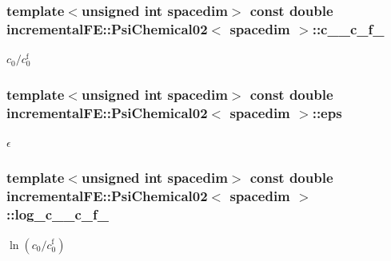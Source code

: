 \subsubsection[{\texorpdfstring{c\+\_\+0\+\_\+c\+\_\+f\+\_\+0}{c_0_c_f_0}}]{\setlength{\rightskip}{0pt plus 5cm}template$<$unsigned int spacedim$>$ const double {\bf incremental\+F\+E\+::\+Psi\+Chemical02}$<$ spacedim $>$\+::c\+\_\+\_\+c\+\_\+f\+\_\hspace{0.3cm}{\ttfamily [private]}}\hypertarget{classincremental_f_e_1_1_psi_chemical02_aa2b9c1f2f65985cd003d9e33a5e54875}{}\label{classincremental_f_e_1_1_psi_chemical02_aa2b9c1f2f65985cd003d9e33a5e54875}
$c_0 / c^\mathrm{f}_0$ 
\subsubsection[{\texorpdfstring{eps}{eps}}]{\setlength{\rightskip}{0pt plus 5cm}template$<$unsigned int spacedim$>$ const double {\bf incremental\+F\+E\+::\+Psi\+Chemical02}$<$ spacedim $>$\+::eps\hspace{0.3cm}{\ttfamily [private]}}\hypertarget{classincremental_f_e_1_1_psi_chemical02_a1062004f111d9b425c16e3e3c1c4ce20}{}\label{classincremental_f_e_1_1_psi_chemical02_a1062004f111d9b425c16e3e3c1c4ce20}
$\epsilon$ 
\subsubsection[{\texorpdfstring{log\+\_\+c\+\_\+0\+\_\+c\+\_\+f\+\_\+0}{log_c_0_c_f_0}}]{\setlength{\rightskip}{0pt plus 5cm}template$<$unsigned int spacedim$>$ const double {\bf incremental\+F\+E\+::\+Psi\+Chemical02}$<$ spacedim $>$\+::log\+\_\+c\+\_\+\_\+c\+\_\+f\+\_\hspace{0.3cm}{\ttfamily [private]}}\hypertarget{classincremental_f_e_1_1_psi_chemical02_a35ebf4f4790fd12b1660146f2714704a}{}\label{classincremental_f_e_1_1_psi_chemical02_a35ebf4f4790fd12b1660146f2714704a}
$\ln(c_0 / c^\mathrm{f}_0)$ 
